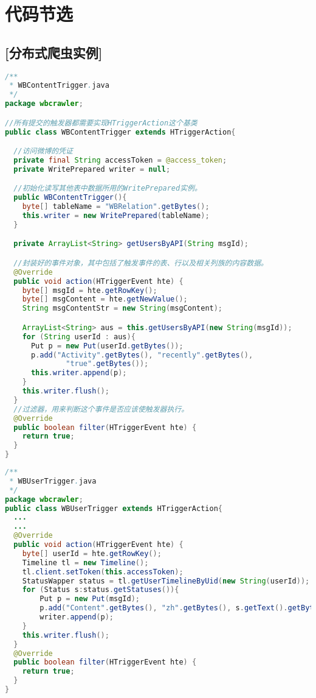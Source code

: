 \section{代码节选}
\subsection{\textbf{[分布式爬虫实例]}}
\label{code:wbcrawler}
\begin{lstlisting}[language=java]
/**
 * WBContentTrigger.java
 */
package wbcrawler;

//所有提交的触发器都需要实现HTriggerAction这个基类
public class WBContentTrigger extends HTriggerAction{

  //访问微博的凭证
  private final String accessToken = @access_token;
  private WritePrepared writer = null;

  //初始化读写其他表中数据所用的WritePrepared实例。
  public WBContentTrigger(){
    byte[] tableName = "WBRelation".getBytes();
    this.writer = new WritePrepared(tableName);
  }

  private ArrayList<String> getUsersByAPI(String msgId);

  //封装好的事件对象，其中包括了触发事件的表、行以及相关列族的内容数据。
  @Override
  public void action(HTriggerEvent hte) {
    byte[] msgId = hte.getRowKey();
    byte[] msgContent = hte.getNewValue();
    String msgContentStr = new String(msgContent);

    ArrayList<String> aus = this.getUsersByAPI(new String(msgId));
    for (String userId : aus){
      Put p = new Put(userId.getBytes());
      p.add("Activity".getBytes(), "recently".getBytes(),
      		  "true".getBytes());
      this.writer.append(p);
    }
    this.writer.flush();
  }
  //过滤器，用来判断这个事件是否应该使触发器执行。
  @Override
  public boolean filter(HTriggerEvent hte) {
    return true;
  }
}
\end{lstlisting}
\begin{lstlisting}[language=java]
/**
 * WBUserTrigger.java
 */
package wbcrawler;
public class WBUserTrigger extends HTriggerAction{
  ...
  ...
  @Override
  public void action(HTriggerEvent hte) {
	byte[] userId = hte.getRowKey();
	Timeline tl = new Timeline();
	tl.client.setToken(this.accessToken);
	StatusWapper status = tl.getUserTimelineByUid(new String(userId));
	for (Status s:status.getStatuses()){
		Put p = new Put(msgId);
		p.add("Content".getBytes(), "zh".getBytes(), s.getText().getBytes());
		writer.append(p);
	}
	this.writer.flush();
  }
  @Override
  public boolean filter(HTriggerEvent hte) {
    return true;
  }
}
\end{lstlisting}


